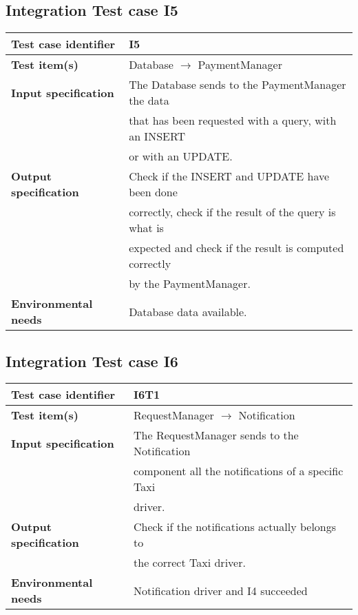 	\hypertarget{chapter 3.5}{ }
	\subsection{Integration Test case I5}
		\begin{adjustbox}{max width=\textwidth}
			\begin{tabular}{ l l}
				\hline 		\textbf{Test case identifier} & I5 \\
				\hline		\textbf{Test item(s)}  & Database $\rightarrow$ PaymentManager \\
				\hline		\textbf{Input specification}  & The Database sends to the PaymentManager the data \\ &  that has been requested with a query, with an INSERT\\ &  or with an UPDATE. \\
				\hline		\textbf{Output specification} & Check if the INSERT and UPDATE have been done\\ & correctly, check if the result of the query is what is\\ &  expected and check if the result is computed correctly\\ & by the PaymentManager.\\
				\hline		\textbf{Environmental needs} & Database data available.\\
				\hline
			\end{tabular}
		\end{adjustbox}
	
	\hypertarget{chapter 3.6}{ }
	\subsection{Integration Test case I6}
		\begin{adjustbox}{max width=\textwidth}
			\begin{tabular}{ l l}
				\hline 		\textbf{Test case identifier} & I6T1 \\
				\hline		\textbf{Test item(s)}  & RequestManager $\rightarrow$ Notification \\
				\hline		\textbf{Input specification} & The RequestManager sends to the Notification \\ & component all the notifications of a specific Taxi \\& driver.\\
				\hline		\textbf{Output specification} & Check if the notifications actually belongs to\\& the correct Taxi driver.\\
				\hline		\textbf{Environmental needs} & Notification driver and I4 succeeded\\
				\hline
			\end{tabular}
		\end{adjustbox}
		
